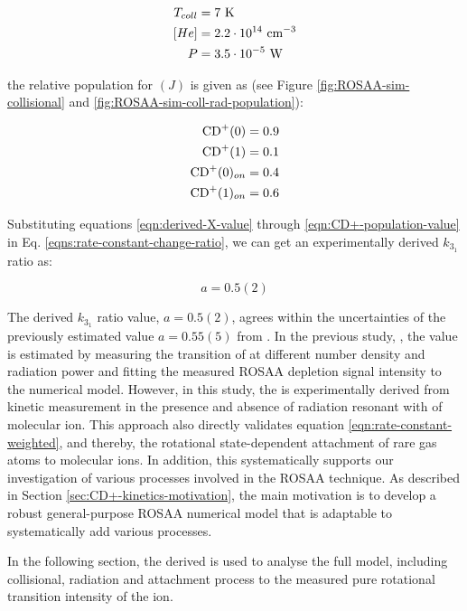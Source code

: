 \begin{align*}
    T_{coll} & = 7\ \text{K}                      \\
    [He]     & = 2.2 \cdot 10^{14}\ \text{cm$^{-3}$} \\
    P        & = 3.5 \cdot 10^{-5}\ \text{W}
\end{align*}

the relative population for \CD$(J)$ is given as (see Figure
\ref{fig:ROSAA-sim-collisional} and \ref{fig:ROSAA-sim-coll-rad-population}):

\begin{align}
    \text{CD}^+(0)      & = 0.9                                  \\
    \text{CD}^+(1)      & = 0.1                                  \\
    \text{CD}^+(0)_{on} & = 0.4                                  \\
    \text{CD}^+(1)_{on} & = 0.6 \label{eqn:CD+-population-value}
\end{align}

Substituting equations \ref{eqn:derived-X-value} through
\ref{eqn:CD+-population-value} in Eq. \ref{eqns:rate-constant-change-ratio}, we
can get an experimentally derived $k_{3_1}$ ratio as:

\begin{equation}
    a = 0.5(2)
    \label{eqn:k31-ratio}
\end{equation}

The derived $k_{3_1}$ ratio value, $a=0.5(2)$, agrees within the uncertainties of the previously
estimated value $a=0.55(5)$ from \citet{Brunken2017}. In the previous study,
\cite{Brunken2017}, the  value is estimated by measuring the \CDline
transition of \CD at different number density and radiation power and fitting
the measured ROSAA depletion signal intensity to the numerical model. However,
in this study, the  is experimentally derived from kinetic measurement
in the presence and absence of radiation resonant with \CDline of \CD molecular
ion. This approach also directly validates equation
\ref{eqn:rate-constant-weighted}, and thereby, the rotational state-dependent
attachment of rare gas atoms to molecular ions. In addition, this
systematically supports our investigation of various processes involved in the
ROSAA technique. As described in Section \ref{sec:CD+-kinetics-motivation},
the main motivation is to develop a robust general-purpose ROSAA numerical
model that is adaptable to systematically add various processes.

In the following section, the derived  is used to analyse the full
model, including collisional, radiation and attachment process to the measured
pure rotational transition intensity of the \CD ion.

